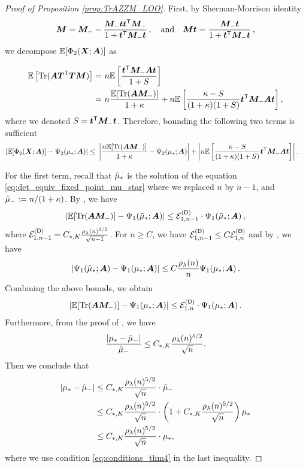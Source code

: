 \begin{proof}[Proof of Proposition \ref{prop:TrAZZM_LOO}]
First, by Sherman-Morrison identity 
\[
    {\boldsymbol M} = {\boldsymbol M}_- - \frac{{\boldsymbol M}_-{\boldsymbol t}{\boldsymbol t}^{\mathsf T}{\boldsymbol M}_-}{1+{\boldsymbol t}^{\mathsf T}{\boldsymbol M}_-{\boldsymbol t}}\,,\quad \text{and} \quad {\boldsymbol M}{\boldsymbol t} = \frac{{\boldsymbol M}_-{\boldsymbol t}}{1+{\boldsymbol t}^{\mathsf T}{\boldsymbol M}_-{\boldsymbol t}}\,,
\]
we decompose $\mathbb{E}[\Phi_2({\boldsymbol X};{\boldsymbol A})]$ as 

\[
\begin{aligned}
\mathbb{E} \left[ {\rm Tr}( {\boldsymbol A} {\boldsymbol T}^{\mathsf T} {\boldsymbol T} {\boldsymbol M}) \right] =&~ n\mathbb{E} \left[ \frac{{\boldsymbol t}^{\mathsf T} {\boldsymbol M}_- {\boldsymbol A} {\boldsymbol t}}{1 + S}\right] \\
= &~ n\frac{\mathbb{E}[{\rm Tr} ( {\boldsymbol A} {\boldsymbol M}_- )]}{1 + \kappa} + n\mathbb{E} \left[ \frac{\kappa - S}{(1+\kappa)(1 + S)} {\boldsymbol t}^{\mathsf T} {\boldsymbol M}_- {\boldsymbol A} {\boldsymbol t}\right],
\end{aligned}
\]
where we denoted $S = {\boldsymbol t}^{\mathsf T} {\boldsymbol M}_- {\boldsymbol t}$. Therefore, bounding the following two terms is sufficient
\begin{equation}\label{eq:decompo_deterministic_2}
\begin{aligned}
    \left|\mathbb{E}[\Phi_2({\boldsymbol X};{\boldsymbol A})] -\Psi_2(\mu_*;{\boldsymbol A})\right| \le&~
    \left|\frac{n\mathbb{E}[{\rm Tr} (  {\boldsymbol A} {\boldsymbol M}_- )]}{1 + \kappa} - \Psi_2( \mu_*;{\boldsymbol A})\right|+ 
    \left| n\mathbb{E} \left[ \frac{\kappa - S}{(1+\kappa)(1 + S)} {\boldsymbol t}^{\mathsf T} {\boldsymbol M}_- {\boldsymbol A} {\boldsymbol t}\right] \right|.
\end{aligned}
\end{equation}


For the first term,  recall that $\Tilde{\mu}_*$ is the solution of the equation \eqref{eq:det_equiv_fixed_point_mu_star} where we replaced $n$ by $n-1$, and $\Tilde{\mu}_- := n/(1+ \kappa)$. By \citet[Proposition 2]{misiakiewicz2024non}, we have 
\[
\left| \mathbb{E}[{\rm Tr} (  {\boldsymbol A} {\boldsymbol M}_- )] - \Psi_1 (\Tilde{\mu}_* ; {\boldsymbol A} ) \right| \leq {\mathcal E}^{({\sf D})}_{1,n-1}  \cdot \Psi_1 (\Tilde{\mu}_* ; {\boldsymbol A} )\,,
\]
where ${\mathcal E}^{({\sf D})}_{1,n-1} = C_{*,K} \frac{ \rho_\lambda (n)^{5/2} }{\sqrt{n-1}}$. For $n \geq C$, we have ${\mathcal E}_{1,n-1}^{({\sf D})} \leq C {\mathcal E}_{1,n}^{({\sf D})}$ and by \citet[Lemma 3]{misiakiewicz2024non}, we have
\[
|\Psi_1 (\Tilde{\mu}_* ; {\boldsymbol A} ) - \Psi_1 (\mu_* ; {\boldsymbol A} )| \leq C \frac{\rho_\lambda(n)}{n} \Psi_1 (\mu_* ; {\boldsymbol A} )\,.
\]
Combining the above bounds, we obtain
\[
\left| \mathbb{E}[{\rm Tr} (  {\boldsymbol A} {\boldsymbol M}_- )] - \Psi_1 (\mu_* ; {\boldsymbol A} ) \right| \leq {\mathcal E}^{({\sf D})}_{1,n}  \cdot \Psi_1 (\mu_* ; {\boldsymbol A} )\,.
\]
Furthermore, from the proof of \citet[Proposition 4, Claim 3]{misiakiewicz2024non}, we have
\[
\frac{| \mu_* - \Tilde{\mu}_- |}{\Tilde{\mu}_-} \leq C_{*,K} \frac{ \rho_\lambda (n)^{5/2}}{\sqrt{n}}.
\]
Then we conclude that
\begin{align*}
| \mu_* - \Tilde{\mu}_- | &\leq C_{*,K} \frac{ \rho_\lambda (n)^{5/2}}{\sqrt{n}} \cdot \Tilde{\mu}_- \\
&\leq C_{*,K} \frac{ \rho_\lambda (n)^{5/2}}{\sqrt{n}} \cdot \left(1 + C_{*,K} \frac{ \rho_\lambda (n)^{5/2}}{\sqrt{n}}\right)\mu_* \\
&\leq C_{*,K} \frac{ \rho_\lambda (n)^{5/2}}{\sqrt{n}} \cdot \mu_*,    
\end{align*}
where we use condition \eqref{eq:conditions_thm4} in the last inequality.



\end{proof}
